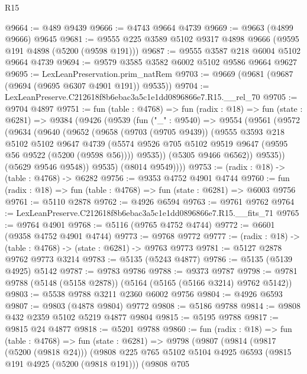 \begin{lexlean}{R15}
\begin{coremodule}
{{{{{{{{{{{@9664 := @489 @9439
@9666 := @4743 @9664 @4739
@9669 := @9663 (@4899 @9666) @9645
@9681 := @9555 @225 @3589 @5102 @9317 @4898 @9666 (@9595 @191 @4898 (@5200 (@9598 @191)))
@9687 := @9555 @3587 @218 @6004 @5102 @9664 @4739
@9694 := @9579 @3585 @3582 @6002 @5102 @9586 @9664 @9627
@9695 := LexLeanPreservation.prim_natRem
@9703 := @9669 (@9681 (@9687 (@9694 (@9695 @6307 @4901 @191)) @9535))
@9704 := LexLeanPreserve.C212618f8b6ebac3a5c1e1dd0896866e7.R15.__rel_70
@9705 := @9704 @4897
@9751 := fun (table : @4768) =>
  fun (radix : @18) =>
  fun (state : @6281) =>
  @9384
    (@9426
      (@9539
        (fun ("_" : @9540) =>
        @9554
          (@9561
            (@9572
              (@9634
                (@9640
                  (@9652
                    (@9658
                      (@9703 (@9705 @9439))
                      (@9555
                        @3593
                        @218
                        @5102
                        @5102
                        @9647
                        @4739
                        (@5574 @9526 @705 @5102 @9519 @9647 (@9595 @56 @9522 (@5200 (@9598 @56))))
                        @9535))
                    (@5305 @9466 @6562))
                  @9535))
              (@5629 @9546 @9548))
            @9535)
          (@8014 @9549))))
@9753 := (radix : @18) -> (table : @4768) -> @6282
@9756 := @9353 @4752 @4901 @4744
@9760 := fun (radix : @18) => fun (table : @4768) => fun (state : @6281) => @6003 @9756
@9761 := @5110 @2878
@9762 := @4926 @6594
@9763 := @9761 @9762
@9764 := LexLeanPreserve.C212618f8b6ebac3a5c1e1dd0896866e7.R15.__fits_71
@9765 := @9764 @4901
@9768 := @5116 (@9765 @4752 @4744)
@9772 := @6601 (@9358 @4752 @4901 @4744)
@9773 := @9768 @9772
@9777 := (radix : @18) -> (table : @4768) -> (state : @6281) -> @9763 @9773
@9781 := @5127 @2878 @9762 @9773 @3214
@9783 := @5135 (@5243 @4877)
@9786 := @5135 (@5139 @4925) @5142
@9787 := @9783 @9786
@9788 := @9373 @9787
@9798 := @9781 @9788 (@5148 (@5158 @2878)) (@5164 (@5165 (@5166 @3214) @9762 @5142))
@9803 := @5538 @9788 @3211 @2360 @6002 @9756
@9804 := @4926 @6593
@9807 := @9803 (@4878 @9804) @9772
@9808 := @5186 @9788
@9814 := @9808 @432 @2359 @5102 @5219 @4877 @9804
@9815 := @5195 @9788
@9817 := @9815 @24 @4877
@9818 := @5201 @9788
@9860 := fun (radix : @18) =>
  fun (table : @4768) =>
  fun (state : @6281) =>
  @9798
    (@9807
      (@9814
        (@9817 (@5200 (@9818 @24)))
        (@9808
          @225
          @765
          @5102
          @5104
          @4925
          @6593
          (@9815 @191 @4925 (@5200 (@9818 @191)))
          (@9808
            @705
}}}}}}}}}}}
\end{coremodule}
\end{lexlean}
